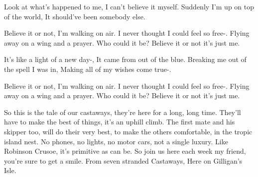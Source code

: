 Look at what's happened to me, 
I can't believe it myself. 
Suddenly I'm up on top of the world, 
It should've been somebody else. 

Believe it or not, 
I'm walking on air. 
I never thought I could feel so free-. 
Flying away on a wing and a prayer. 
Who could it be? 
Believe it or not it's just me. 

It's like a light of a new day-, 
It came from out of the blue. 
Breaking me out of the spell I was in, 
Making all of my wishes come true-. 

Believe it or not, 
I'm walking on air. 
I never thought I could feel so free-. 
Flying away on a wing and a prayer. 
Who could it be? 
Believe it or not it's just me.

So this is the tale of our castaways,
they're here for a long, long time.
They'll have to make the best of things,
it's an uphill climb.
The first mate and his skipper too,
will do their very best,
to make the others comfortable,
in the tropic island nest.
No phones, no lights, no motor cars,
not a single luxury.
Like Robinson Crusoe,
it's primitive as can be.
So join us here each week my friend,
you're sure to get a smile.
From seven stranded Castaways,
Here on Gilligan's Isle.


